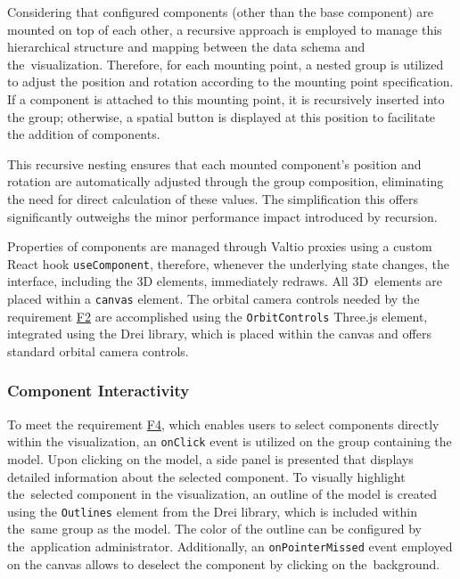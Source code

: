 Considering that configured components (other than the base component) are mounted on top of each other, a recursive approach is employed to manage this hierarchical structure and mapping between the data schema and the~visualization. Therefore, for each mounting point, a nested group is utilized to adjust the position and rotation according to the mounting point specification. If a component is attached to this mounting point, it is recursively inserted into the group; otherwise, a spatial button is displayed at this position to facilitate the addition of components. 

This recursive nesting ensures that each mounted component's position and rotation are automatically adjusted through the group composition, eliminating the need for direct calculation of these values. The simplification this offers significantly outweighs the minor performance impact introduced by recursion.

Properties of components are managed through Valtio proxies using a custom React hook \texttt{useComponent}, therefore, whenever the underlying state changes, the interface, including the 3D elements, immediately redraws.
All 3D~elements are placed within a  \texttt{canvas} element. The orbital camera controls needed by the requirement \hyperref[itm:F2]{F2} are accomplished using the \texttt{OrbitControls} Three.js element, integrated using the Drei library, which is placed within the canvas and offers standard orbital camera controls.


\subsubsection{Component Interactivity}

To meet the requirement \hyperref[itm:F4]{F4}, which enables users to select components directly within the visualization, an \texttt{onClick} event is utilized on the group containing the model. Upon clicking on the model, a side panel is presented that displays detailed information about the selected component. To visually highlight the~selected component in the visualization, an outline of the model is created using the \texttt{Outlines} element from the Drei library, which is included within the~same group as the model. The color of the outline can be configured by the~application administrator. Additionally, an \texttt{onPointerMissed} event employed on the canvas allows to deselect the component by clicking on the~background.


